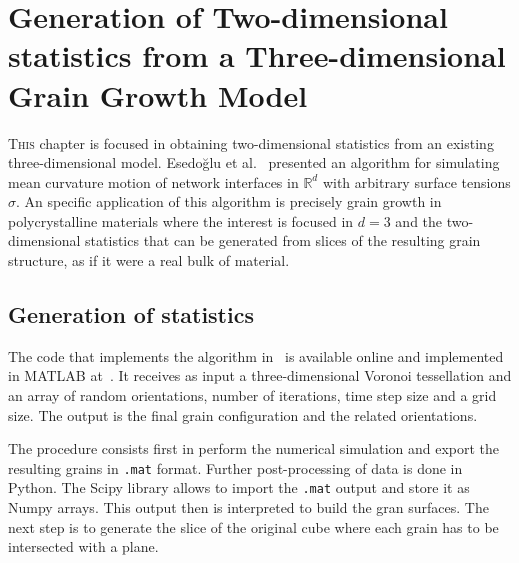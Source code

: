 \chapter{Generation of Two-dimensional statistics from a Three-dimensional Grain Growth Model}
\label{chap:esedoglu}

\lettrine{T}{his} chapter is focused in obtaining two-dimensional statistics from an existing three-dimensional model. 
Esedo\u{g}lu et al.~\cite{Esedoglu2015} presented an algorithm for simulating mean curvature motion of network interfaces in $\mathbb{R}^d$ with arbitrary surface tensions $\sigma$. 
An specific application of this algorithm is precisely grain growth in polycrystalline materials where the interest is focused in $d = 3$ and the two-dimensional statistics that can be generated from slices of the resulting grain structure, as if it were a real bulk of material.

\section{Generation of statistics}
The code that implements the algorithm in~\cite{Esedoglu2015} is available online and implemented in MATLAB at~\cite{esedoglucode}. 
It receives as input a three-dimensional Voronoi tessellation and an array of random orientations, number of iterations, time step size and a grid size. 
The output is the final grain configuration and the related orientations.

The procedure consists first in perform the numerical simulation and export the resulting grains in \texttt{.mat} format. 
Further post-processing of data is done in Python. The Scipy library allows to import the \texttt{.mat} output and store it as Numpy arrays. 
This output then is interpreted to build the gran surfaces. 
The next step is to generate the slice of the original cube where each grain has to be intersected with a %
plane. 

